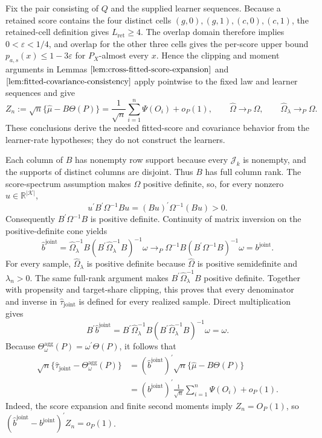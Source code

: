 Fix the pair consisting of \(Q\) and the supplied learner sequences. Because a retained score contains the four distinct cells \((g,0),(g,1),(c,0),(c,1)\), the retained-cell definition gives \(L_{\mathrm{ret}}\ge4\). The overlap domain therefore implies \(0<\varepsilon<1/4\), and overlap for the other three cells gives the per-score upper bound \(p_{a,s}(x)\le1-3\varepsilon\) for \(P_X\)-almost every \(x\). Hence the clipping and moment arguments in Lemmas \(\ref{lem:cross-fitted-score-expansion}\) and \(\ref{lem:fitted-covariance-consistency}\) apply pointwise to the fixed law and learner sequences and give
\[
 Z_n:=\sqrt n\{\widehat\mu-B\Theta(P)\}
 =\frac1{\sqrt n}\sum_{i=1}^n\Psi(O_i)+o_P(1),
 \qquad
 \widehat\Omega\to_P\Omega,
 \qquad
 \widehat\Omega_\lambda\to_P\Omega.
\]
These conclusions derive the needed fitted-score and covariance behavior from the learner-rate hypotheses; they do not construct the learners.

Each column of \(B\) has nonempty row support because every \(\mathcal J_k\) is nonempty, and the supports of distinct columns are disjoint. Thus \(B\) has full column rank. The score-spectrum assumption makes \(\Omega\) positive definite, so, for every nonzero \(u\in\mathbb R^{|\mathcal K|}\),
\[
 u^{\prime}B^{\prime}\Omega^{-1}Bu
 =(Bu)^{\prime}\Omega^{-1}(Bu)>0.
\]
Consequently \(B^{\prime}\Omega^{-1}B\) is positive definite. Continuity of matrix inversion on the positive-definite cone yields
\[
\widehat b^{\mathrm{joint}}
=\widehat\Omega_\lambda^{-1}B
 (B^{\prime}\widehat\Omega_\lambda^{-1}B)^{-1}\omega
\to_P
\Omega^{-1}B(B^{\prime}\Omega^{-1}B)^{-1}\omega
=b^{\mathrm{joint}}.
\]
For every sample, \(\widehat\Omega_\lambda\) is positive definite because \(\widehat\Omega\) is positive semidefinite and \(\lambda_n>0\). The same full-rank argument makes \(B^{\prime}\widehat\Omega_\lambda^{-1}B\) positive definite. Together with propensity and target-share clipping, this proves that every denominator and inverse in \(\widehat\tau_{\mathrm{joint}}\) is defined for every realized sample. Direct multiplication gives
\[
 B^{\prime}\widehat b^{\mathrm{joint}}
 =B^{\prime}\widehat\Omega_\lambda^{-1}B
 (B^{\prime}\widehat\Omega_\lambda^{-1}B)^{-1}\omega
 =\omega.
\]
Because \(\Theta_\omega^{\mathrm{agg}}(P)=\omega^{\prime}\Theta(P)\), it follows that
\[
\begin{aligned}
\sqrt n\{\widehat\tau_{\mathrm{joint}}-\Theta_\omega^{\mathrm{agg}}(P)\}
&=(\widehat b^{\mathrm{joint}})^{\prime}
  \sqrt n\{\widehat\mu-B\Theta(P)\}\\
&=(b^{\mathrm{joint}})^{\prime}\frac1{\sqrt n}
  \sum_{i=1}^n\Psi(O_i)+o_P(1).
\end{aligned}
\]
Indeed, the score expansion and finite second moments imply \(Z_n=O_P(1)\), so \((\widehat b^{\mathrm{joint}}-b^{\mathrm{joint}})^{\prime}Z_n=o_P(1)\).

